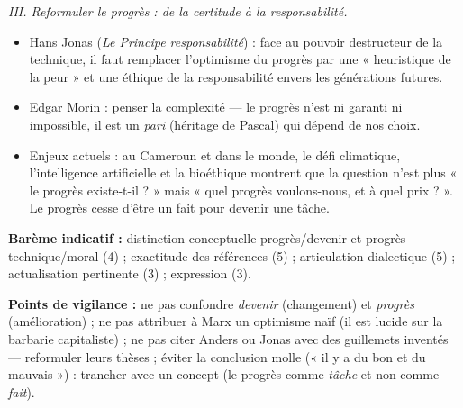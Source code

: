 \documentclass[11pt]{article}
\begin{document}
\begin{corrige}
\emph{III. Reformuler le progrès : de la certitude à la responsabilité.}
\begin{itemize}
\item Hans Jonas (\emph{Le Principe responsabilité}) : face au pouvoir destructeur de la technique, il faut remplacer l'optimisme du progrès par une « heuristique de la peur » et une éthique de la responsabilité envers les générations futures.
\item Edgar Morin : penser la complexité — le progrès n'est ni garanti ni impossible, il est un \emph{pari} (héritage de Pascal) qui dépend de nos choix.
\item Enjeux actuels : au Cameroun et dans le monde, le défi climatique, l'intelligence artificielle et la bioéthique montrent que la question n'est plus « le progrès existe-t-il ? » mais « quel progrès voulons-nous, et à quel prix ? ». Le progrès cesse d'être un fait pour devenir une tâche.
\end{itemize}

\textbf{Barème indicatif :} distinction conceptuelle progrès/devenir et progrès technique/moral (4) ; exactitude des références (5) ; articulation dialectique (5) ; actualisation pertinente (3) ; expression (3).

\textbf{Points de vigilance :} ne pas confondre \emph{devenir} (changement) et \emph{progrès} (amélioration) ; ne pas attribuer à Marx un optimisme naïf (il est lucide sur la barbarie capitaliste) ; ne pas citer Anders ou Jonas avec des guillemets inventés — reformuler leurs thèses ; éviter la conclusion molle (« il y a du bon et du mauvais ») : trancher avec un concept (le progrès comme \emph{tâche} et non comme \emph{fait}).
\end{corrige}
\end{document}
